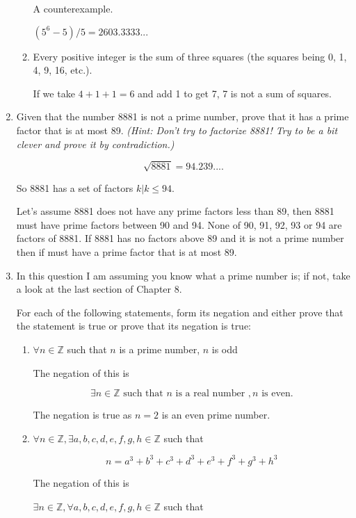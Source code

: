 \documentclass{article}
\begin{document}
\begin{enumerate}
\begin{enumerate}
				A counterexample.
			
				$(5^6 - 5)/5 = 2603.3333 ...$
				
			\item Every positive integer is the sum of three squares (the squares being 0, 1, 4, 9, 16, etc.).
			
				If we take $4 + 1 + 1 = 6$ and add 1 to get 7, 7 is not a sum of squares.
		\end{enumerate}
		
		\item Given that the number 8881 is not a prime number, prove that it has a prime factor that is at most 89.
			\emph{(Hint: Don't try to factorize 8881! Try to be a bit clever and prove it by contradiction.)}
			
			$$\sqrt{8881} = 94.239....$$
			
			So 8881 has a set of factors $k | k \leq 94$.
			
			Let's assume 8881 does not have any prime factors less than 89, then 8881 must have prime factors
			between 90 and 94. None of 90, 91, 92, 93 or 94 are factors of 8881. If 8881 has no factors above 
			89 and it is not a prime number then if must have a prime factor that is at most 89.
			
		\item In this question I am assuming you know what a prime number is; if not, take a look at the last section
		of Chapter 8.
		
		For each of the following statements, form its negation and either prove that the statement is true or prove
		that its negation is true:
		
		\begin{enumerate}
			\item $\forall n \in \mathbb{Z}$ such that $n$ is a prime number, $n$ is odd
			
			The negation of this is
			
			$$\exists n \in \mathbb{Z} \text{ such that } n \text{ is a real number }, n \text{ is even.}$$
			
			The negation is true as $n = 2$ is an even prime number.
			
			\item $\forall n \in \mathbb{Z}, \exists a, b, c, d, e, f, g, h \in \mathbb{Z}$ such that
			
				$$n = a^3 + b^3 + c^3 + d^3 + e^3 + f^3 + g^3 + h^3$$
				
			The negation of this is
			
				$\exists n \in \mathbb{Z}, \forall a, b, c, d, e, f, g, h \in \mathbb{Z}$ such that
				

\end{enumerate}
\end{enumerate}
\end{document}
